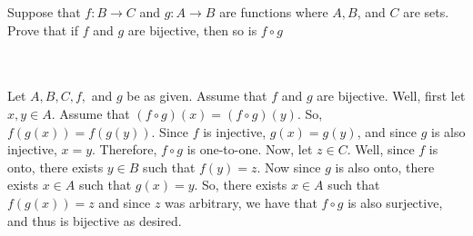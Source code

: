 Suppose that $f:B\rightarrow C$ and $g:A\rightarrow B$ are functions where $A, B$, and $C$ are sets.
Prove that if $f$ and $g$ are bijective, then so is $f\circ g$\\\\

\begin{solution}\renewcommand{\qedsymbol}{}\ \\
    Let $A, B, C, f,$ and $g$ be as given. Assume that $f$ and $g$ are bijective. Well, first let
    $x,y\in A$. Assume that $(f\circ g)(x)=(f\circ g)(y)$. So, $f(g(x))=f(g(y))$. Since $f$ is
    injective, $g(x)=g(y)$, and since $g$ is also injective, $x=y$. Therefore, $f\circ g$ is
    one-to-one. Now, let $z\in C$. Well, since $f$ is onto, there exists $y\in B$ such that $f(y)=z$.
    Now since $g$ is also onto, there exists $x\in A$ such that $g(x)=y$. So, there exists $x\in A$ such
    that $f(g(x))=z$ and since $z$ was arbitrary, we have that $f\circ g$ is also surjective, and thus
    is bijective as desired.

\end{solution}